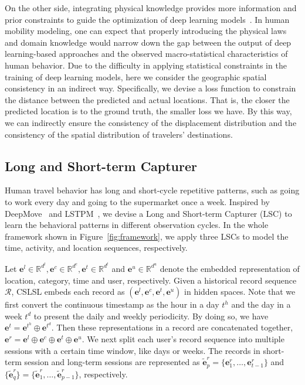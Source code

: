 \documentclass[sigconf]{acmart}
\begin{document}
    On the other side, integrating physical knowledge provides more information and prior constraints to guide the optimization of deep learning models~\cite{karniadakis2021physics,willard2020integrating}. In human mobility modeling, one can expect that properly introducing the physical laws and domain knowledge would narrow down the gap between the output of deep learning-based approaches and the observed macro-statistical characteristics of human behavior. 
    Due to the difficulty in applying statistical constraints in the training of deep learning models, here we consider the geographic spatial consistency in an indirect way. Specifically, we devise a loss function to constrain the distance between the predicted and actual locations. That is, the closer the predicted location is to the ground truth, the smaller loss we have. By this way, we can indirectly ensure the consistency of the displacement distribution and the consistency of the spatial distribution of travelers' destinations.

    
\subsection{Long and Short-term Capturer}
    Human travel behavior has long and short-cycle repetitive patterns, such as going to work every day and going to the supermarket once a week. Inspired by DeepMove~\cite{feng2018deepmove} and LSTPM~\cite{sun2020go}, we devise a Long and Short-term Capturer (LSC) to learn the behavioral patterns in different observation cycles. In the whole framework shown in Figure~\ref{fig:framework}, we apply three LSCs to model the time, activity, and location sequences, respectively.
    
    Let $\boldsymbol{e}^l\in\mathbb{R}^{d^l},\boldsymbol{e}^c\in\mathbb{R}^{d^c},\boldsymbol{e}^t\in\mathbb{R}^{d^t}$ and $\boldsymbol{e}^u\in\mathbb{R}^{d^u}$ denote the embedded representation of location, category, time and user, respectively. Given a historical record sequence $\mathcal{R}$, CSLSL embeds each record as $(\boldsymbol{e}^l, \boldsymbol{e}^c, \boldsymbol{e}^t, \boldsymbol{e}^u)$ in hidden spaces. Note that we first convert the continuous timestamp as the hour in a day $t^h$ and the day in a week $t^d$ to present the daily and weekly periodicity. By doing so, we have $\boldsymbol{e}^t=\boldsymbol{e}^{t^h}\oplus \boldsymbol{e}^{t^d}$. Then these representations in a record are concatenated together, $\boldsymbol{e}^r=\boldsymbol{e}^l\oplus \boldsymbol{e}^c\oplus \boldsymbol{e}^t\oplus \boldsymbol{e}^u$.
    We next split each user's record sequence into multiple sessions with a certain time window, like days or weeks. The records in short-term session and long-term sessions are represented as $\widetilde{\boldsymbol{e}}^r_p=\{\boldsymbol{e}^r_1, \dots,\boldsymbol{e}^r_{t-1}\}$ and $\{\widetilde{\boldsymbol{e}}^r_q\}=\{\widetilde{\boldsymbol{e}}^r_1, \dots,\widetilde{\boldsymbol{e}}^r_{p-1}\}$, respectively. 
    
\end{document}
